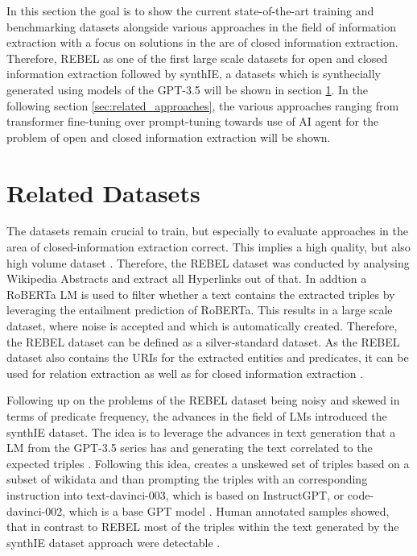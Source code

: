 \documentclass[a4paper,oneside,bibliography=totoc]{scrbook}
\begin{document}
In this section the goal is to show the current state-of-the-art training and benchmarking datasets alongside various approaches in the field of information extraction with a focus on solutions in the are of closed information extraction. Therefore, REBEL as one of the first large scale datasets for open and closed information extraction followed by synthIE, a datasets which is synthecially generated using models of the GPT-3.5 will be shown in section \ref{sec:related_datasets}. In the following section \ref{sec:related_approaches}, the various approaches ranging from transformer fine-tuning over prompt-tuning towards use of \ac{AI} agent for the problem of open and closed information extraction will be shown.

\section{Related Datasets}
\label{sec:related_datasets}

The datasets remain crucial to train, but especially to evaluate approaches in the area of closed-information extraction correct. This implies a high quality, but also high volume dataset \cite{Josifoski2023}. Therefore, the REBEL dataset was conducted by analysing Wikipedia Abstracts and extract all Hyperlinks out of that. In addtion a RoBERTa \ac{LM} is used to filter whether a text contains the extracted triples by leveraging the entailment prediction of RoBERTa. This results in a large scale dataset, where noise is accepted and which is automatically created. Therefore, the REBEL dataset can be defined as a silver-standard dataset. As the REBEL dataset also contains the \acp{URI} for the extracted entities and predicates, it can be used for relation extraction as well as for closed information extraction \cite{HuguetCabot2021}.

Following up on the problems of the REBEL dataset being noisy and skewed in terms of predicate frequency, the advances in the field of \acp{LM} \citet{Josifoski2023} introduced the synthIE dataset. The idea is to leverage the advances in text generation that a \ac{LM} from the GPT-3.5 series has and generating the text correlated to the expected triples \cite{Josifoski2023}. Following this idea, \citet{Josifoski2023} creates a unskewed set of triples based on a subset of wikidata and than prompting the triples with an corresponding instruction into text-davinci-003, which is based on InstructGPT, or code-davinci-002, which is a base GPT model \cite{Josifoski2023,OpenAI2025a}. Human annotated samples showed, that in contrast to REBEL most of the triples within the text generated by the synthIE dataset approach were detectable \cite{Josifoski2023}.
\end{document}
